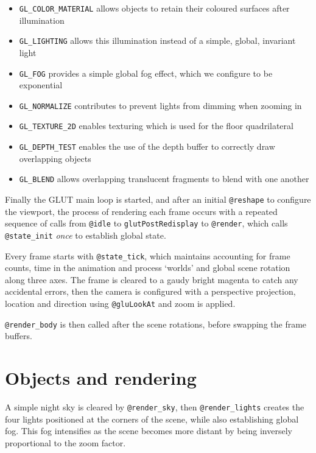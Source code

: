 \documentclass[a4paper,titlepage,12pt]{article}
\begin{document}
\begin{itemize}
	\item \texttt{GL\_COLOR\_MATERIAL} allows objects to retain their
	      coloured surfaces after illumination
	\item \texttt{GL\_LIGHTING} allows this illumination instead of a
	      simple, global, invariant light
	\item \texttt{GL\_FOG} provides a simple global fog effect, which we
	      configure to be exponential
	\item \texttt{GL\_NORMALIZE} contributes to prevent lights from dimming
	      when zooming in
	\item \texttt{GL\_TEXTURE\_2D} enables texturing which is used for the
	      floor quadrilateral
	\item \texttt{GL\_DEPTH\_TEST} enables the use of the depth buffer to
	      correctly draw overlapping objects
	\item \texttt{GL\_BLEND} allows overlapping translucent fragments to
	      blend with one another
\end{itemize}

Finally the GLUT main loop is started, and after an initial \texttt{@reshape}
to configure the viewport, the process of rendering each frame occurs with a
repeated sequence of calls from \texttt{@idle} to \texttt{glutPostRedisplay} to
\texttt{@render}, which calls \texttt{@state\_init} \textit{once} to establish
global state.

Every frame starts with \texttt{@state\_tick}, which maintains accounting for
frame counts, time in the animation and process `worlds' and global scene
rotation along three axes. The frame is cleared to a gaudy bright magenta to
catch any accidental errors, then the camera is configured with a perspective
projection, location and direction using \texttt{@gluLookAt} and zoom is
applied.

\texttt{@render\_body} is then called after the scene rotations, before
swapping the frame buffers.

\newpage

\section{Objects and rendering}

A simple night sky is cleared by \texttt{@render\_sky}, then
\texttt{@render\_lights} creates the four lights positioned at the corners of
the scene, while also establishing global fog. This fog intensifies as the
scene becomes more distant by being inversely proportional to the zoom factor.
\end{document}

